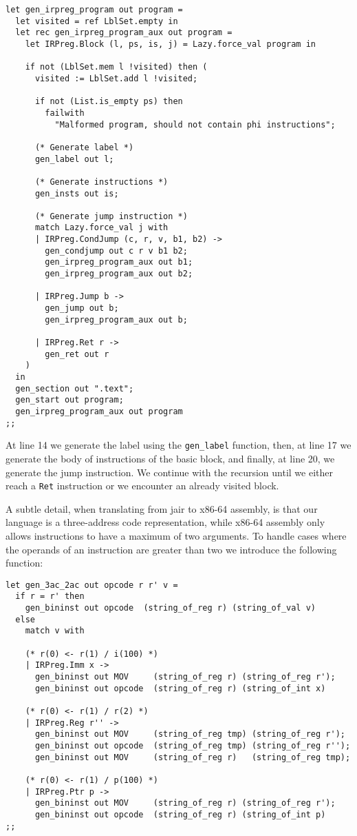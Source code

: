 \begin{lstlisting}[style=OCaml]
let gen_irpreg_program out program =
  let visited = ref LblSet.empty in
  let rec gen_irpreg_program_aux out program =
    let IRPreg.Block (l, ps, is, j) = Lazy.force_val program in

    if not (LblSet.mem l !visited) then (
      visited := LblSet.add l !visited;

      if not (List.is_empty ps) then
        failwith
          "Malformed program, should not contain phi instructions";

      (* Generate label *)
      gen_label out l;

      (* Generate instructions *)
      gen_insts out is;

      (* Generate jump instruction *)
      match Lazy.force_val j with
      | IRPreg.CondJump (c, r, v, b1, b2) ->
        gen_condjump out c r v b1 b2;
        gen_irpreg_program_aux out b1;
        gen_irpreg_program_aux out b2;

      | IRPreg.Jump b ->
        gen_jump out b;
        gen_irpreg_program_aux out b;

      | IRPreg.Ret r ->
        gen_ret out r
    )
  in
  gen_section out ".text";
  gen_start out program;
  gen_irpreg_program_aux out program
;;
\end{lstlisting}

At line 14 we generate the label using the \texttt{gen\_label} function, then, at line 17 we generate the body of instructions of the basic block, and finally, at line 20, we generate the jump instruction. We continue with the recursion until we either reach a \texttt{Ret} instruction or we encounter an already visited block.

A subtle detail, when translating from \gls{jair} to x86-64 assembly, is that our language is a three-address code representation, while x86-64 assembly only allows instructions to have a maximum of two arguments.
To handle cases where the operands of an instruction are greater than two we introduce the following function:

\begin{lstlisting}[style=OCaml]
let gen_3ac_2ac out opcode r r' v =
  if r = r' then
    gen_bininst out opcode  (string_of_reg r) (string_of_val v)
  else
    match v with

    (* r(0) <- r(1) / i(100) *)
    | IRPreg.Imm x ->
      gen_bininst out MOV     (string_of_reg r) (string_of_reg r');
      gen_bininst out opcode  (string_of_reg r) (string_of_int x)

    (* r(0) <- r(1) / r(2) *)
    | IRPreg.Reg r'' ->
      gen_bininst out MOV     (string_of_reg tmp) (string_of_reg r');
      gen_bininst out opcode  (string_of_reg tmp) (string_of_reg r'');
      gen_bininst out MOV     (string_of_reg r)   (string_of_reg tmp);

    (* r(0) <- r(1) / p(100) *)
    | IRPreg.Ptr p ->
      gen_bininst out MOV     (string_of_reg r) (string_of_reg r');
      gen_bininst out opcode  (string_of_reg r) (string_of_int p)
;;
\end{lstlisting}

